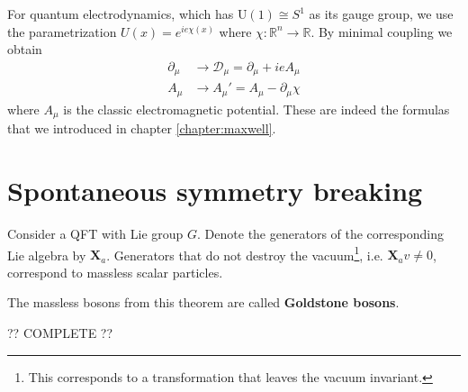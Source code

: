     \begin{example}[QED]
        For quantum electrodynamics, which has U$(1)\cong S^1$ as its gauge group, we use the parametrization $U(x) = e^{ie\chi(x)}$ where $\chi:\mathbb{R}^n\rightarrow\mathbb{R}$. By minimal coupling we obtain
        \begin{align}
            \partial_\mu &\longrightarrow \mathcal{D}_\mu = \partial_\mu + ieA_\mu\\
            A_\mu &\longrightarrow A_\mu' = A_\mu - \partial_\mu\chi
        \end{align}
        where $A_\mu$ is the classic electromagnetic potential. These are indeed the formulas that we introduced in chapter \ref{chapter:maxwell}.
    \end{example}

\section{Spontaneous symmetry breaking}

    \begin{theorem}[Goldstone]
        Consider a QFT with Lie group $G$. Denote the generators of the corresponding Lie algebra by $\mathbf{X}_a$. Generators that do not destroy the vacuum\footnote{This corresponds to a transformation that leaves the vacuum invariant.}, i.e. $\mathbf{X}_av\neq0$, correspond to massless scalar particles.
    \end{theorem}
    The massless bosons from this theorem are called \textbf{Goldstone bosons}.

    ?? COMPLETE ??